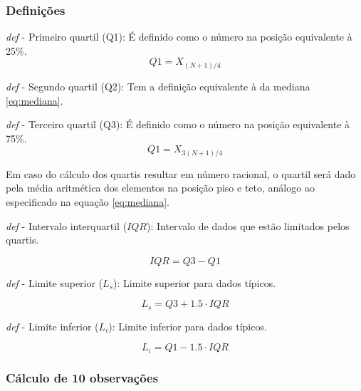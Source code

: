 \documentclass[a4paper, 12pt, titlepage]{article}
\begin{document}

\subsubsection*{Definições}
\noindent \textit{def} - Primeiro quartil (Q1): É definido como o número na posição equivalente à 25\%.
\begin{equation*}
    Q1 = X_{(N+1)/4} 
\end{equation*}

\noindent \textit{def} - Segundo quartil (Q2): Tem a definição equivalente à da mediana \eqref{eq:mediana}. 

\noindent \textit{def} - Terceiro quartil (Q3): É definido como o número na posição equivalente à 75\%.    
\begin{equation*}
    Q1 = X_{3(N+1)/4} 
\end{equation*}

\noindent Em caso do cálculo dos quartis resultar em número racional, o quartil será dado pela média aritmética dos elementos na posição piso e teto, análogo ao especificado na equação \eqref{eq:mediana}.

\noindent \textit{def} - Intervalo interquartil ($IQR$): Intervalo de dados que estão limitados pelos quartis.

\begin{equation*}
    IQR = Q3-Q1 
\end{equation*}

\noindent \textit{def} - Limite superior ($L_s$): Limite superior para dados típicos.

\begin{equation*}
    L_s = Q3+1.5 \cdot IQR
\end{equation*}

\noindent \textit{def} - Limite inferior ($L_i$): Limite inferior para dados típicos.

\begin{equation*}
    L_i = Q1-1.5 \cdot IQR
\end{equation*}


\subsubsection*{Cálculo de 10 observações}
\end{document}
